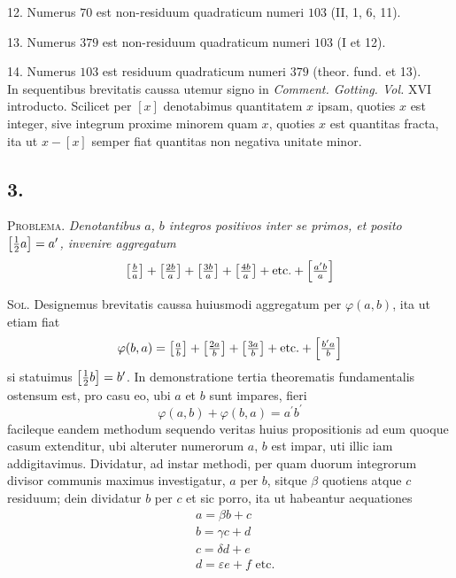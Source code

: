 \documentclass[twoside,12pt, showframe]{memoir}
\let\oldfrac\frac
\def\frac#1#2{\mathchoice{\tfrac{#1}{#2}}{\oldfrac{#1}{#2}}{\genfrac{}{}{}{2}{#1}{#2\mathstrut}}{\genfrac{}{}{}{3}{#1}{#2\mathstrut}}}
\begin{document}
12. Numerus \(70\) est non-residuum quadraticum numeri \(103\) (II, 1, 6, 11).
 
13. Numerus \(379\) est non-residuum quadraticum numeri \(103\) (I et 12).
 
14. Numerus \(103\) est residuum quadraticum numeri \(379\) (theor. fund. et 13).\\

In sequentibus brevitatis caussa utemur signo in \textit{Comment. Gotting. Vol.} XVI introducto. Scilicet per \([x]\) denotabimus quantitatem \(x\) ipsam, quoties \(x\) est integer, sive integrum proxime minorem quam \(x\), quoties \(x\) est quantitas fracta, ita ut \(x-[x]\) semper fiat quantitas non negativa unitate minor.

\subsection*{3.}
 
\textsc{Problema.} \textit{Denotantibus \(a\), \(b\) integros positivos inter se primos, et posito \(\left[\frac{1}{2} a\right]=a^{\prime}\), invenire aggregatum}
\[\left[\frac{b}{a}\right]+\left[\frac{2 b}{a}\right]+\left[\frac{3 b}{a}\right]+\left[\frac{4 b}{a}\right]+\text{etc.}+\left[\frac{a^{\prime} b}{a}\right]\]
 
\textsc{Sol.} Designemus brevitatis caussa huiusmodi aggregatum per \(\varphi(a, b)\), ita ut etiam fiat
\[\varphi(b, a)=\left[\frac{a}{b}\right]+\left[\frac{2 a}{b}\right]+\left[\frac{3 a}{b}\right]+\text{etc.}+\left[\frac{b^{\prime} a}{b}\right]\]
si statuimus \(\left[\frac{1}{2} b\right]=b^{\prime}\). In demonstratione tertia theorematis fundamentalis ostensum est, pro casu eo, ubi \(a\) et \(b\) sunt impares, fieri
\[\varphi(a, b)+\varphi(b, a)=a^{\prime} b^{\prime}\]
facileque eandem methodum sequendo veritas huius propositionis ad eum quoque casum extenditur, ubi alteruter numerorum \(a\), \(b\) est impar, uti illic iam addigitavimus. Dividatur, ad instar methodi, per quam duorum integrorum divisor communis maximus investigatur, \(a\) per \(b\), sitque \(\beta\) quotiens atque \(c\) residuum; dein dividatur \(b\) per \(c\) et sic porro, ita ut habeantur aequationes\clearpage\noindent%
\[\begin{aligned}
& a=\beta b+c \\
& b=\gamma c+d \\
& c=\delta d+e \\
& d=\varepsilon e+f \text{ etc.}
\end{aligned}\]
 
\end{document}
